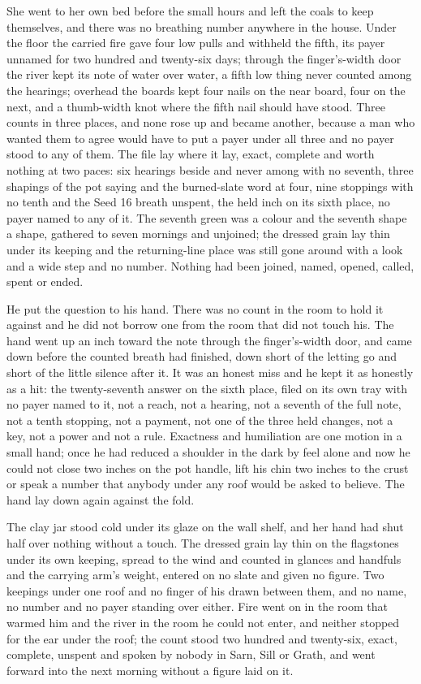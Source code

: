 She went to her own bed before the small hours and left the coals to keep themselves, and there was no breathing number anywhere in the house. Under the floor the carried fire gave four low pulls and withheld the fifth, its payer unnamed for two hundred and twenty-six days; through the finger's-width door the river kept its note of water over water, a fifth low thing never counted among the hearings; overhead the boards kept four nails on the near board, four on the next, and a thumb-width knot where the fifth nail should have stood. Three counts in three places, and none rose up and became another, because a man who wanted them to agree would have to put a payer under all three and no payer stood to any of them. The file lay where it lay, exact, complete and worth nothing at two paces: six hearings beside and never among with no seventh, three shapings of the pot saying and the burned-slate word at four, nine stoppings with no tenth and the Seed 16 breath unspent, the held inch on its sixth place, no payer named to any of it. The seventh green was a colour and the seventh shape a shape, gathered to seven mornings and unjoined; the dressed grain lay thin under its keeping and the returning-line place was still gone around with a look and a wide step and no number. Nothing had been joined, named, opened, called, spent or ended.

He put the question to his hand. There was no count in the room to hold it against and he did not borrow one from the room that did not touch his. The hand went up an inch toward the note through the finger's-width door, and came down before the counted breath had finished, down short of the letting go and short of the little silence after it. It was an honest miss and he kept it as honestly as a hit: the twenty-seventh answer on the sixth place, filed on its own tray with no payer named to it, not a reach, not a hearing, not a seventh of the full note, not a tenth stopping, not a payment, not one of the three held changes, not a key, not a power and not a rule. Exactness and humiliation are one motion in a small hand; once he had reduced a shoulder in the dark by feel alone and now he could not close two inches on the pot handle, lift his chin two inches to the crust or speak a number that anybody under any roof would be asked to believe. The hand lay down again against the fold.

The clay jar stood cold under its glaze on the wall shelf, and her hand had shut half over nothing without a touch. The dressed grain lay thin on the flagstones under its own keeping, spread to the wind and counted in glances and handfuls and the carrying arm's weight, entered on no slate and given no figure. Two keepings under one roof and no finger of his drawn between them, and no name, no number and no payer standing over either. Fire went on in the room that warmed him and the river in the room he could not enter, and neither stopped for the ear under the roof; the count stood two hundred and twenty-six, exact, complete, unspent and spoken by nobody in Sarn, Sill or Grath, and went forward into the next morning without a figure laid on it.
